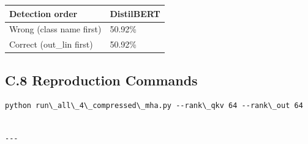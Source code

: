 \begin{table}[H]
\centering
\small
\begin{tabular}{ll}
\toprule
\textbf{Detection order} & \textbf{DistilBERT} \\
\midrule
Wrong (class name first) & 50.92\% \\
Correct (out\_lin first) & 50.92\% \\
\bottomrule
\end{tabular}
\end{table}

\subsection{C.8 Reproduction Commands}

\begin{lstlisting}
python run\_all\_4\_compressed\_mha.py --rank\_qkv 64 --rank\_out 64
\end{lstlisting}
\begin{lstlisting}

---
\end{lstlisting}